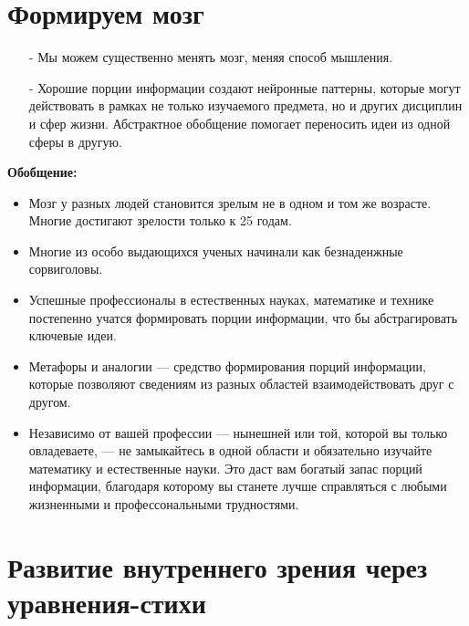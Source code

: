 \documentclass{article}
\begin{document}
\section{Формируем мозг}
\begin{itemize}
\item[-] Мы можем существенно менять мозг, меняя способ мышления.
\item[-] Хорошие порции информации создают нейронные паттерны, которые могут действовать в рамках не только изучаемого предмета, но и других дисциплин и сфер жизни. Абстрактное обобщение помогает переносить идеи из одной сферы в другую.
\end{itemize}
\textbf{Обобщение:}
\begin{itemize}
\item Мозг у разных людей становится зрелым не в одном и том же возрасте. Многие достигают зрелости только к 25 годам.
\item Многие из особо выдающихся ученых начинали как безнаденжные сорвиголовы.
\item Успешные профессионалы в естественных науках, математике и технике постепенно учатся формировать порции информации, что бы абстрагировать ключевые идеи.
\item Метафоры и аналогии --- средство формирования порций информации, которые позволяют сведениям из разных областей взаимодействовать друг с другом.
\item Независимо от вашей профессии --- нынешней или той, которой вы только овладеваете, --- не замыкайтесь в одной области и обязательно изучайте математику и естественные науки. Это даст вам богатый запас порций информации, благодаря которому вы станете лучше справляться с любыми жизненными и профессональными трудностями.
\end{itemize}

\section{Развитие внутреннего зрения через уравнения-стихи}
\end{document}

